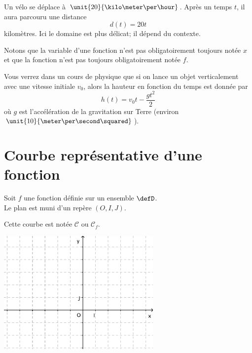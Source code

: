 \begin{example}
    Un vélo se déplace à \( \unit{20}{\kilo\meter\per\hour}\). Après un temps \( t\), il aura parcouru une distance
    \begin{equation}
        d(t)=20t
    \end{equation}
    kilomètres. Ici le domaine est plus délicat; il dépend du contexte.

    Notons que la variable d'une fonction n'est pas obligatoirement toujours notée \( x\) et que la fonction n'est pas toujours obligatoirement notée \( f\).
\end{example}

\begin{example}
    Vous verrez dans un cours de physique que si on lance un objet verticalement avec une vitesse initiale \( v_0\), alors la hauteur en fonction du temps est donnée par
    \begin{equation}
        h(t)=v_0t-\frac{ gt^2 }{2}
    \end{equation}
    où \( g\) est l'accélération de la gravitation sur Terre (environ \( \unit{10}{\meter\per\second\squared}\)).
\end{example}

\section{Courbe représentative d'une fonction}

Soit $f$ une fonction définie sur un ensemble $\defD$. \\ Le plan est muni d'un repère $(O,I,J)$.

\begin{definition}
\end{definition}

Cette courbe est notée $\mathscr{C}$ ou $\mathscr{C}_f$.\\

{\centering 
  \includegraphics[width=8cm]{F_Axes.pdf}    
\par}

